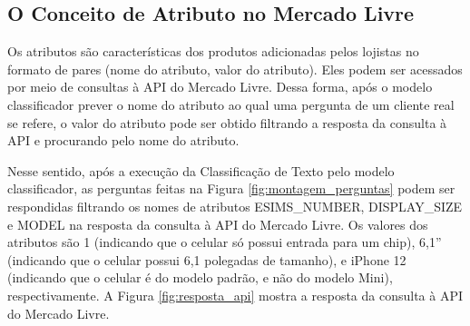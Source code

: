 \subsection{O Conceito de Atributo no Mercado Livre}
\label{o conceito de atributo no mercado livre}
Os atributos são características dos produtos adicionadas pelos lojistas no formato de pares (nome do atributo, valor do atributo). Eles podem ser acessados por meio de consultas à API do Mercado Livre. Dessa forma, após o modelo classificador prever o nome do atributo ao qual uma pergunta de um cliente real se refere, o valor do atributo pode ser obtido filtrando a resposta da consulta à API e procurando pelo nome do atributo.

Nesse sentido, após a execução da Classificação de Texto pelo modelo classificador, as perguntas feitas na Figura \ref{fig:montagem_perguntas} podem ser respondidas filtrando os nomes de atributos ESIMS\_NUMBER, DISPLAY\_SIZE e MODEL na resposta da consulta à API do Mercado Livre. Os valores dos atributos são 1 (indicando que o celular só possui entrada para um chip), 6,1'' (indicando que o celular possui 6,1 polegadas de tamanho), e iPhone 12 (indicando que o celular é do modelo padrão, e não do modelo Mini), respectivamente. A Figura \ref{fig:resposta_api} mostra a resposta da consulta à API do Mercado Livre.

